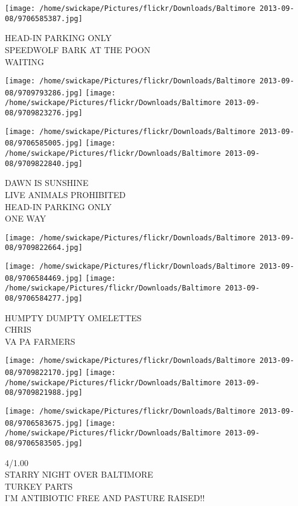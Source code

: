 \documentclass[10pt,letterpaper]{article}
\begin{document}
\vspace{0.25in}
\texttt{[image: /home/swickape/Pictures/flickr/Downloads/Baltimore 2013-09-08/9706585387.jpg]}

HEAD{-}IN PARKING ONLY\\
SPEEDWOLF BARK AT THE POON\\
WAITING
\pagebreak

\texttt{[image: /home/swickape/Pictures/flickr/Downloads/Baltimore 2013-09-08/9709793286.jpg]}
\texttt{[image: /home/swickape/Pictures/flickr/Downloads/Baltimore 2013-09-08/9709823276.jpg]}

\texttt{[image: /home/swickape/Pictures/flickr/Downloads/Baltimore 2013-09-08/9706585005.jpg]}
\texttt{[image: /home/swickape/Pictures/flickr/Downloads/Baltimore 2013-09-08/9709822840.jpg]}

DAWN IS SUNSHINE\\
LIVE ANIMALS PROHIBITED\\
HEAD{-}IN PARKING ONLY\\
ONE WAY
\pagebreak

\texttt{[image: /home/swickape/Pictures/flickr/Downloads/Baltimore 2013-09-08/9709822664.jpg]}

\vspace{0.25in}
\texttt{[image: /home/swickape/Pictures/flickr/Downloads/Baltimore 2013-09-08/9706584469.jpg]}
\texttt{[image: /home/swickape/Pictures/flickr/Downloads/Baltimore 2013-09-08/9706584277.jpg]}

HUMPTY DUMPTY OMELETTES\\
CHRIS\\
VA PA FARMERS
\pagebreak

\texttt{[image: /home/swickape/Pictures/flickr/Downloads/Baltimore 2013-09-08/9709822170.jpg]}
\texttt{[image: /home/swickape/Pictures/flickr/Downloads/Baltimore 2013-09-08/9709821988.jpg]}

\texttt{[image: /home/swickape/Pictures/flickr/Downloads/Baltimore 2013-09-08/9706583675.jpg]}
\texttt{[image: /home/swickape/Pictures/flickr/Downloads/Baltimore 2013-09-08/9706583505.jpg]}

4/1.00\\
STARRY NIGHT OVER BALTIMORE\\
TURKEY PARTS\\
I'M ANTIBIOTIC FREE AND PASTURE RAISED!!
\pagebreak
\end{document}
